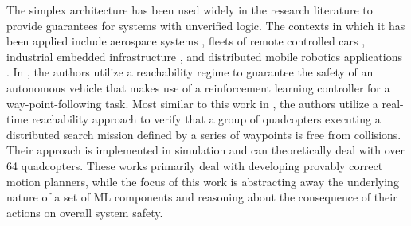\documentclass[manuscript,screen,review]{acmart}
\begin{document}
The simplex architecture has been used widely in the research literature to provide guarantees for systems with unverified logic. The contexts in which it has been applied include aerospace systems \cite{SetoCaseStudy2000}, fleets of remote controlled cars \cite{Crenshaw2007}, industrial embedded infrastructure \cite{Bak2009Simplex,Yang2017}, and distributed mobile robotics applications \cite{Desai2018,Tran2020}. In \cite{Lin2020}, the authors utilize a reachability regime to guarantee the safety of an autonomous vehicle that makes use of a reinforcement learning controller for a way-point-following task. Most similar to this work in \cite{Tran2020}, the authors utilize a real-time reachability approach to verify that a group of quadcopters executing a distributed search mission defined by a series of waypoints is free from collisions. Their approach is implemented in simulation and can theoretically deal with over 64 quadcopters. These works primarily deal with developing provably correct motion planners, while the focus of this work is abstracting away the underlying nature of a set of ML components and reasoning about the consequence of their actions on overall system safety.



\end{document}

